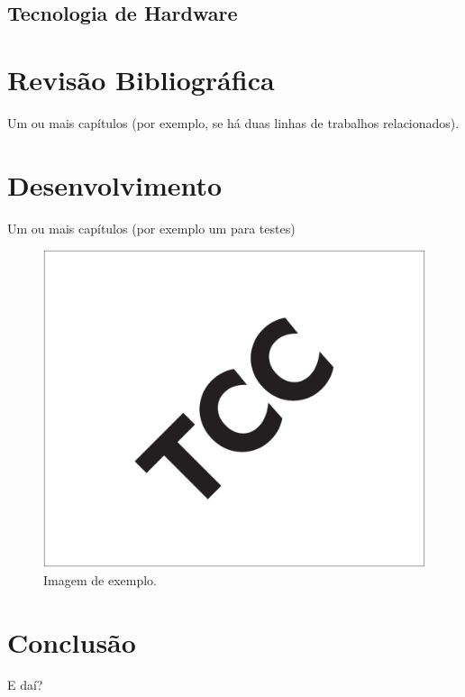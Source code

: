 \documentclass[12pt, %
openright, 
oneside, %
a4paper,    %
brazil]{facom-ufu-abntex2}
\begin{document}
\section{Tecnologia de Hardware}


\chapter{Revisão Bibliográfica}
Um ou mais capítulos (por exemplo, se há duas linhas de trabalhos relacionados).



\chapter{Desenvolvimento}
Um ou mais capítulos (por exemplo um para testes)


\begin{figure}[!ht]
    \centering
	\includegraphics[width=0.55\linewidth]{imagemExemplo.pdf}
	\caption[Isso é o que aparece no sumário]{Imagem de exemplo.}
	\label{fig:graficosVariandoTamanhoRede}
\end{figure}



\chapter[Conclusão]{Conclusão}
E daí?





\postextual



\end{document}
